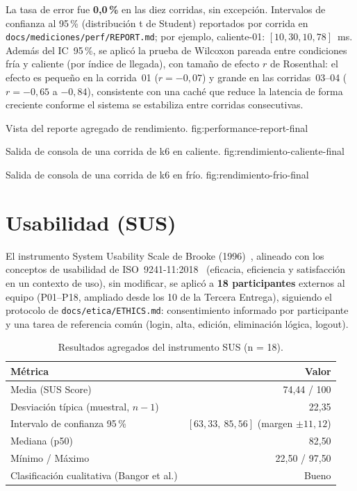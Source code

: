 La tasa de error fue \textbf{0{,}0\,\%} en las diez corridas, sin
excepci\'on. Intervalos de confianza al 95\,\% (distribuci\'on t de
Student) reportados por corrida en \texttt{docs/mediciones/perf/REPORT.md};
por ejemplo, caliente-01: $[10{,}30, 10{,}78]$~ms. Adem\'as del IC~95\,\%,
se aplic\'o la prueba de Wilcoxon pareada entre condiciones fr\'ia y
caliente (por \'indice de llegada), con tama\~no de efecto $r$ de
Rosenthal: el efecto es peque\~no en la corrida~01 ($r=-0{,}07$) y grande en
las corridas~03--04 ($r=-0{,}65$ a $-0{,}84$), consistente con una cach\'e
que reduce la latencia de forma creciente conforme el sistema se estabiliza
entre corridas consecutivas.

%
{Vista del reporte agregado de rendimiento.}%
{fig:performance-report-final}

%
{Salida de consola de una corrida de k6 en caliente.}%
{fig:rendimiento-caliente-final}

%
{Salida de consola de una corrida de k6 en fr\'io.}%
{fig:rendimiento-frio-final}

\section{Usabilidad (SUS)}
\label{sec:sus-final}

El instrumento System Usability Scale de Brooke (1996)~\cite{sus-brooke1996},
alineado con los conceptos de usabilidad de
ISO~9241-11:2018~\cite{iso9241-11} (eficacia, eficiencia y satisfacci\'on
en un contexto de uso), sin modificar, se aplic\'o a \textbf{18
participantes} externos al equipo
(P01--P18, ampliado desde los 10 de la Tercera Entrega), siguiendo el
protocolo de \texttt{docs/etica/ETHICS.md}: consentimiento informado por
participante y una tarea de referencia com\'un (login, alta, edici\'on,
eliminaci\'on l\'ogica, logout).

\begin{table}[H]
  \centering
  \caption{Resultados agregados del instrumento SUS (n = 18).}
  \label{tab:sus-final}
  \begin{tabular}{lr}
    \toprule
    M\'etrica & Valor \\
    \midrule
    Media (SUS Score) & 74{,}44 / 100 \\
    Desviaci\'on t\'ipica (muestral, $n-1$) & 22{,}35 \\
    Intervalo de confianza 95\,\% & $[63{,}33,\ 85{,}56]$ (margen $\pm 11{,}12$) \\
    Mediana (p50) & 82{,}50 \\
    M\'inimo / M\'aximo & 22{,}50 / 97{,}50 \\
    Clasificaci\'on cualitativa (Bangor et al.) & Bueno \\
    \bottomrule
  \end{tabular}
\end{table}

